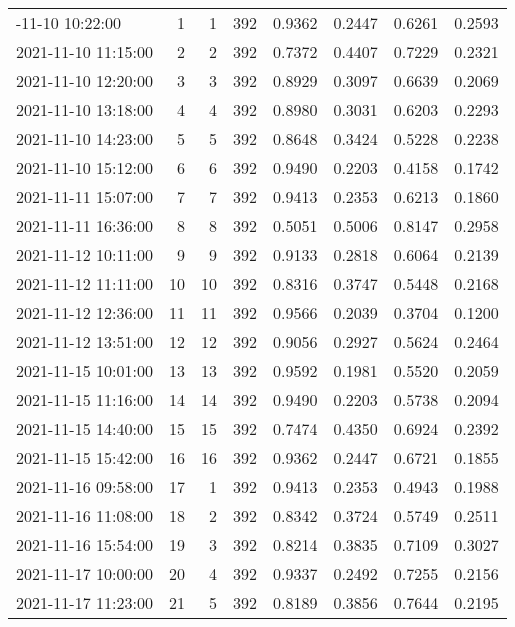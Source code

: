\begin{longtable}{lrrrrrrr}
\bottomrule
\endlastfoot
2021-11-10 10:22:00 &    1 &    1 &    392 &   0.9362 & 0.2447 & 0.6261 & 0.2593 \\
2021-11-10 11:15:00 &    2 &    2 &    392 &   0.7372 & 0.4407 & 0.7229 & 0.2321 \\
2021-11-10 12:20:00 &    3 &    3 &    392 &   0.8929 & 0.3097 & 0.6639 & 0.2069 \\
2021-11-10 13:18:00 &    4 &    4 &    392 &   0.8980 & 0.3031 & 0.6203 & 0.2293 \\
2021-11-10 14:23:00 &    5 &    5 &    392 &   0.8648 & 0.3424 & 0.5228 & 0.2238 \\
2021-11-10 15:12:00 &    6 &    6 &    392 &   0.9490 & 0.2203 & 0.4158 & 0.1742 \\
2021-11-11 15:07:00 &    7 &    7 &    392 &   0.9413 & 0.2353 & 0.6213 & 0.1860 \\
2021-11-11 16:36:00 &    8 &    8 &    392 &   0.5051 & 0.5006 & 0.8147 & 0.2958 \\
2021-11-12 10:11:00 &    9 &    9 &    392 &   0.9133 & 0.2818 & 0.6064 & 0.2139 \\
2021-11-12 11:11:00 &   10 &   10 &    392 &   0.8316 & 0.3747 & 0.5448 & 0.2168 \\
2021-11-12 12:36:00 &   11 &   11 &    392 &   0.9566 & 0.2039 & 0.3704 & 0.1200 \\
2021-11-12 13:51:00 &   12 &   12 &    392 &   0.9056 & 0.2927 & 0.5624 & 0.2464 \\
2021-11-15 10:01:00 &   13 &   13 &    392 &   0.9592 & 0.1981 & 0.5520 & 0.2059 \\
2021-11-15 11:16:00 &   14 &   14 &    392 &   0.9490 & 0.2203 & 0.5738 & 0.2094 \\
2021-11-15 14:40:00 &   15 &   15 &    392 &   0.7474 & 0.4350 & 0.6924 & 0.2392 \\
2021-11-15 15:42:00 &   16 &   16 &    392 &   0.9362 & 0.2447 & 0.6721 & 0.1855 \\
2021-11-16 09:58:00 &   17 &    1 &    392 &   0.9413 & 0.2353 & 0.4943 & 0.1988 \\
2021-11-16 11:08:00 &   18 &    2 &    392 &   0.8342 & 0.3724 & 0.5749 & 0.2511 \\
2021-11-16 15:54:00 &   19 &    3 &    392 &   0.8214 & 0.3835 & 0.7109 & 0.3027 \\
2021-11-17 10:00:00 &   20 &    4 &    392 &   0.9337 & 0.2492 & 0.7255 & 0.2156 \\
2021-11-17 11:23:00 &   21 &    5 &    392 &   0.8189 & 0.3856 & 0.7644 & 0.2195 \\

\end{longtable}
